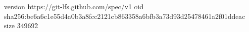 version https://git-lfs.github.com/spec/v1
oid sha256:be6a6c1e55d4a0b3a8fcc2121cb863358a6bfb3a73d93d25478461a2f01ddeac
size 349692
